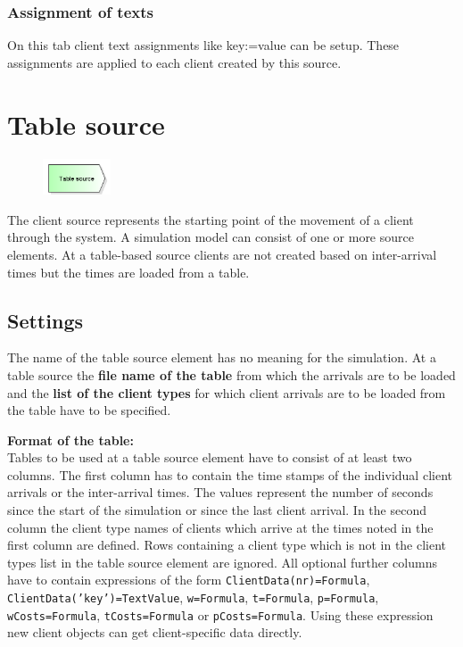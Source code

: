 \subsubsection*{Assignment of texts}

On this tab client text assignments like key:=value can be setup.
These assignments are applied to each client created by this source.


\section{Table source}
\label{ref:ModelElementSourceTable}

\begin{figure}
\vspace{-22pt}
\includegraphics[width=2cm]{imageModelElementSourceTable.png}
\vspace{-22pt}
\end{figure}

The client source represents the starting point of the movement of a client through the system.
A simulation model can consist of one or more source elements.
At a table-based source clients are not created based on inter-arrival times but the
times are loaded from a table.

\subsection*{Settings}

The name of the table source element has no meaning for the simulation.
At a table source the \textbf{file name of the table} from which the arrivals
are to be loaded and the \textbf{list of the client types} for which client
arrivals are to be loaded from the table have to be specified.

\textbf{Format of the table:}~\\
Tables to be used at a table source element have to consist of at least two columns.
The first column has to contain the time stamps of the individual client arrivals
or the inter-arrival times. The values represent the number of seconds since the
start of the simulation or since the last client arrival.
In the second column the client type names of clients which arrive at the times
noted in the first column are defined. Rows containing a client type which is
not in the client types list in the table source element are ignored.
All optional further columns have to contain expressions of the form
\texttt{ClientData(nr)=Formula}, \texttt{ClientData('key')=TextValue},
\texttt{w=Formula}, \texttt{t=Formula}, \texttt{p=Formula},
\texttt{wCosts=Formula}, \texttt{tCosts=Formula} or \texttt{pCosts=Formula}.
Using these expression new client objects can get client-specific data directly.

